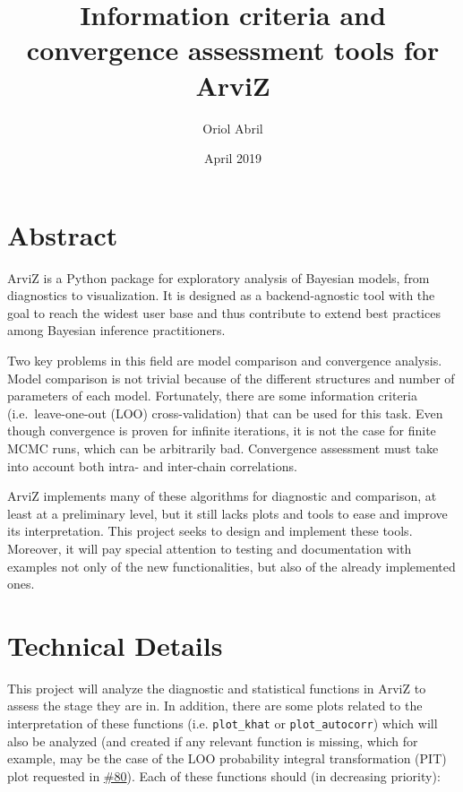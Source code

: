 \documentclass{article}
\title{Information criteria and convergence assessment tools for
ArviZ}
\author{Oriol Abril}
\date{April 2019}
\begin{document}
\maketitle

\section{Abstract}\label{abstract}

ArviZ is a Python package for exploratory analysis of Bayesian models,
from diagnostics to visualization. It is designed as a backend-agnostic
tool with the goal to reach the widest user base and thus contribute to
extend best practices among Bayesian inference practitioners.

Two key problems in this field are model comparison and convergence
analysis. Model comparison is not trivial because of the different
structures and number of parameters of each model. Fortunately, there
are some information criteria (i.e.~leave-one-out (LOO)
cross-validation) that can be used for this task. Even though
convergence is proven for infinite iterations, it is not the case for
finite MCMC runs, which can be arbitrarily bad. Convergence assessment
must take into account both intra- and inter-chain correlations.

ArviZ implements many of these algorithms for diagnostic and comparison,
at least at a preliminary level, but it still lacks plots and tools to
ease and improve its interpretation. This project seeks to design and
implement these tools. Moreover, it will pay special attention to
testing and documentation with examples not only of the new
functionalities, but also of the already implemented ones.

\section{Technical Details}\label{technical-details}

This project will analyze the diagnostic and statistical functions in
ArviZ to assess the stage they are in. In addition, there are some plots
related to the interpretation of these functions (i.e.
\texttt{plot\_khat} or \texttt{plot\_autocorr}) which will also be
analyzed (and created if any relevant function is missing, which for
example, may be the case of the LOO probability integral transformation
(PIT) plot requested in
\href{https://github.com/arviz-devs/arviz/issues/80}{\#80}). Each of
these functions should (in decreasing priority):
\end{document}
